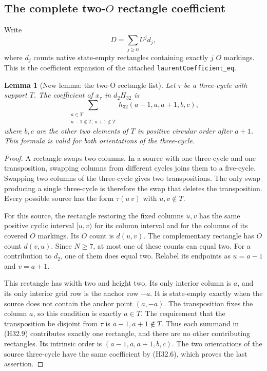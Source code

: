 \documentclass[11pt,oneside]{report}
\newtheorem{lemma}[theorem]{Lemma}
\theoremstyle{definition}
\numberwithin{equation}{section}
\newcommand{\decl}[1]{\textnormal{\nolinkurl{#1}}}
\begin{document}
\subsection{The complete two-\texorpdfstring{$O$}{O} rectangle coefficient}

Write
\[
                         D=\sum_{j\geq0}U^j d_j,
 \tag{H32.8}
\]
where $d_j$ counts native state-empty rectangles containing exactly
$j$ $O$ markings. This is the coefficient expansion of the attached
\decl{laurentCoefficient_eq}.

\begin{lemma}[New lemma: the two-O rectangle list]
\label{J21:lem:h32-two-O-neighbours}
Let $\tau$ be a three-cycle with support $T$.
The coefficient of $x_\tau$ in $d_2H_{32}$ is
\[
 \sum_{\substack{a\in T\\a-1\notin T,\ a+1\notin T}}
 h_{32}(a-1,a,a+1,b,c),
 \tag{H32.9}
\]
where $b,c$ are the other two elements of $T$ in positive circular
order after $a+1$. This formula is valid for both orientations of
the three-cycle.
\end{lemma}
\begin{proof}
A rectangle swaps two columns. In a source with one three-cycle and
one transposition, swapping columns from different cycles joins them
to a five-cycle. Swapping two columns of the three-cycle gives two
transpositions. The only swap producing a single three-cycle is
therefore the swap that deletes the transposition.
Every possible source has the form $\tau(u\,v)$ with $u,v\notin T$.

For this source, the rectangle restoring the fixed columns $u,v$
has the same positive cyclic interval $[u,v)$ for its column interval
and for the columns of its covered $O$ markings.
Its $O$ count is $d(u,v)$.
The complementary rectangle has $O$ count $d(v,u)$.
Since $N\geq7$, at most one of these counts can equal two.
For a contribution to $d_2$, one of them does equal two.
Relabel its endpoints as $u=a-1$ and $v=a+1$.

This rectangle has width two and height two.
Its only interior column is $a$, and its only interior grid row is
the anchor row $-a$.
It is state-empty exactly when the source does not contain the anchor
point $(a,-a)$.
The transposition fixes the column $a$, so this condition is exactly
$a\in T$.
The requirement that the transposition be disjoint from $\tau$ is
$a-1,a+1\notin T$.
Thus each summand in (H32.9) contributes exactly one rectangle, and
there are no other contributing rectangles.
Its intrinsic order is $(a-1,a,a+1,b,c)$.
The two orientations of the source three-cycle have the same
coefficient by (H32.6), which proves the last assertion.
\end{proof}
\end{document}
